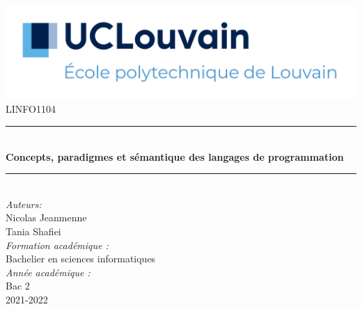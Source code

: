 \begin{titlepage}

\newcommand{\HRule}{\rule{\linewidth}{0.5mm}} 							%
\center 
 
\includegraphics[width=\textwidth]{pictures/UCLouvain-EPL.png}\\[1cm]

\textsc{\large LINFO1104}\\[1cm] 										%
\HRule \\[0.8cm]
{ \huge \bfseries Concepts, paradigmes et sémantique des langages de programmation}\\[0.7cm]								%
\HRule \\[2cm]
\large
\emph{Auteurs:}\\
Nicolas Jeanmenne\\
Tania Shafiei\\[1.5cm]													%
\emph{Formation académique :}\\
Bachelier en sciences informatiques\\[0.4cm]
\emph{Année académique :}\\
Bac 2\\[5cm]
{\large 2021-2022}\\[5cm] 	%

\vfill 
\end{titlepage}